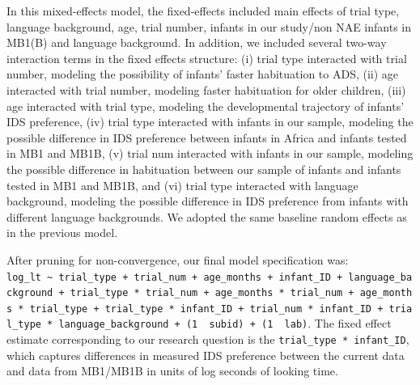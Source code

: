 \documentclass[
  ,man,floatsintext]{apa6}
\begin{document}
In this mixed-effects model, the fixed-effects included main effects of trial type, language background, age, trial number, infants in our study/non NAE infants in MB1(B) and language background. In addition, we included several two-way interaction terms in the fixed effects structure: (i) trial type interacted with trial number, modeling the possibility of infants' faster habituation to ADS, (ii) age interacted with trial number, modeling faster habituation for older children, (iii) age interacted with trial type, modeling the developmental trajectory of infants' IDS preference, (iv) trial type interacted with infants in our sample, modeling the possible difference in IDS preference between infants in Africa and infants tested in MB1 and MB1B, (v) trial num interacted with infants in our sample, modeling the possible difference in habituation between our sample of infants and infants tested in MB1 and MB1B, and (vi) trial type interacted with language background, modeling the possible difference in IDS preference from infants with different language backgrounds. We adopted the same baseline random effects as in the previous model.

After pruning for non-convergence, our final model specification was: \texttt{log\_lt\ \textasciitilde{}\ trial\_type\ +\ trial\_num\ +\ age\_months\ +\ infant\_ID\ +\ language\_background\ +\ trial\_type\ *\ trial\_num\ +\ age\_months\ *\ trial\_num\ +\ age\_months\ *\ trial\_type\ +\ trial\_type\ *\ infant\_ID\ +\ trial\_num\ *\ infant\_ID\ +\ trial\_type\ *\ language\_background\ +\ (1\ \textbar{}\ subid)\ +\ (1\ \textbar{}\ lab)}. The fixed effect estimate corresponding to our research question is the \texttt{trial\_type\ *\ infant\_ID}, which captures differences in measured IDS preference between the current data and data from MB1/MB1B in units of log seconds of looking time.
\end{document}
